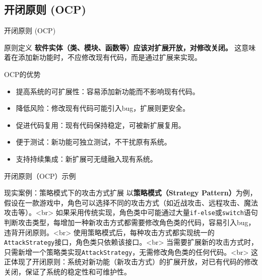 \documentclass[UTF8,aspectratio=169]{beamer}
\begin{document}
\subsection{开闭原则 (OCP)}

\begin{frame}{开闭原则 (OCP)}
    \begin{ytublock}{原则定义}
        \textbf{软件实体（类、模块、函数等）应该对扩展开放，对修改关闭。}
        这意味着在添加新功能时，不应修改现有代码，而是通过扩展来实现。
    \end{ytublock}
    \begin{ytublock}{OCP的优势}
        \begin{itemize}
            \item 提高系统的可扩展性：容易添加新功能而不影响现有代码。
            \item 降低风险：修改现有代码可能引入bug，扩展则更安全。
            \item 促进代码复用：现有代码保持稳定，可被新扩展复用。
            \item 便于测试：新功能可独立测试，不干扰原有系统。
            \item 支持持续集成：新扩展可无缝融入现有系统。
        \end{itemize}
    \end{ytublock}
\end{frame}

\begin{frame}{开闭原则（OCP）示例}
    \begin{exampleytublock}{现实案例：策略模式下的攻击方式扩展}
        以\textbf{策略模式（Strategy Pattern）}为例，假设在一款游戏中，角色可以选择不同的攻击方式（如近战攻击、远程攻击、魔法攻击等）。<br>
        如果采用传统实现，角色类中可能通过大量\texttt{if-else}或\texttt{switch}语句判断攻击类型，每增加一种新攻击方式都需要修改角色类的代码，容易引入bug，违背开闭原则。<br>
        使用策略模式后，每种攻击方式都实现统一的\texttt{AttackStrategy}接口，角色类只依赖该接口。<br>
        当需要扩展新的攻击方式时，只需新增一个策略类实现\texttt{AttackStrategy}，无需修改角色类的任何代码。<br>
        这正体现了开闭原则：系统对新功能（新攻击方式）的扩展开放，对已有代码的修改关闭，保证了系统的稳定性和可维护性。
    \end{exampleytublock}
\end{frame}
\end{document}
